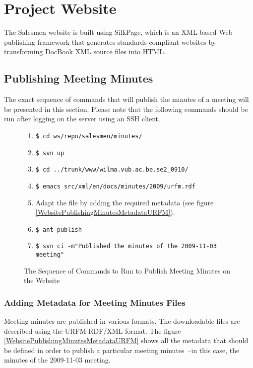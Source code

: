 \section{Project Website}\label{Website}

The Salesmen website is built using SilkPage, which is an XML-based 
Web publishing framework that generates standards-compliant websites by
transforming DocBook XML source files into HTML.

\subsection{Publishing Meeting Minutes}\label{WebsitePublishingMinutes}
The exact sequence of commands that will publish the minutes of a
meeting will be presented in this section. Please note that the following
commands should be run after logging on the server using an SSH client.

\begin{figure}[hb]
\caption{The Sequence of Commands to Run to Publish Meeting Minutes on the Website}
\label{WebsitePublishingMinutesCommands}
\begin{enumerate}
\item \verb*#$ cd ws/repo/salesmen/minutes/#
\item \verb*#$ svn up#
\item \verb*#$ cd ../trunk/www/wilma.vub.ac.be.se2_0910/#
\item \verb*#$ emacs src/xml/en/docs/minutes/2009/urfm.rdf#
\item Adapt the file by adding the required metadata (see figure \ref{WebsitePublishingMinutesMetadataURFM}).
\item \verb*#$ ant publish#
\item \verb*#$ svn ci -m"Published the minutes of the 2009-11-03 meeting"#
\end{enumerate}
\end{figure}

\subsubsection{Adding Metadata for Meeting Minutes Files}\label{WebsitePublishingMinutesMetadata}

Meeting minutes are published in various formats. The downloadable files
are described using the URFM RDF/XML format. 
The figure \ref{WebsitePublishingMinutesMetadataURFM} shows all the 
metadata that should be defined in order to publish a particular meeting
minutes~--in this case, the minutes of the 2009-11-03 meeting.

